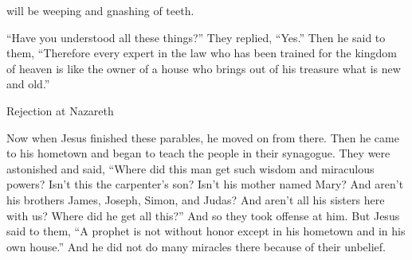 {will be
weeping
and
gnashing
of teeth.
\par }{\PP {}“Have you understood
all
these things?” They replied,
“Yes.”
Then he said
to them,
“Therefore
every
expert in the law
who has been trained
for the kingdom
of heaven
is
like
the owner of a house
who
brings out
of
his
treasure
what is new
and
old.”
\par }{\SH Rejection at Nazareth
\par }{\PP {}Now when
Jesus
finished
these
parables,
he moved on
from there.
Then
he came
to
his
hometown
and began to teach
the people
in
their
synagogue.
They
were astonished
and
said,
“Where
did this
man get such wisdom
and
miraculous powers?
Isn’t
this
the carpenter’s
son? Isn’t
his
mother
named
Mary? And
aren’t his
brothers
James,
Joseph,
Simon,
and Judas?
And
aren’t
all
his
sisters
here
with
us? Where
did he
get all
this?”
And
so they took offense
at
him.
But
Jesus
said
to them,
“A prophet
is
not
without honor
except
in
his hometown
and
in
his own
house.”
And
he did
not
do
many
miracles
there
because of
their
unbelief.

}

